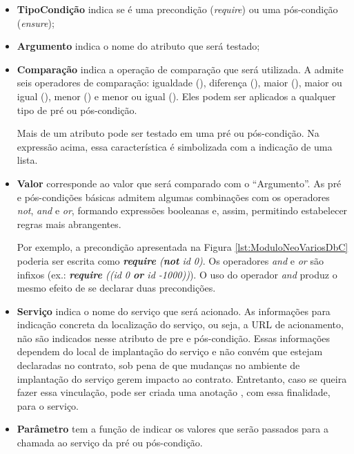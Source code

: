 \begin{itemize}
\item \textbf{TipoCondição} indica se é uma precondição (\emph{require}) ou uma
pós-condição (\emph{ensure});

\item \textbf{Argumento} indica o nome do atributo que será testado; 

\item \textbf{Comparação} indica a operação de comparação que será utilizada. A
\neoidl{}  admite seis operadores de comparação: igualdade (\literal{==}), 
diferença (\literal{<>}), maior (\literal{>}), maior ou igual
(\literal{>=}), menor (\literal{<}) e menor ou igual (\literal{<=}). Eles podem ser aplicados  a
qualquer tipo de pré ou pós-condição.

Mais de um atributo pode ser testado em uma pré ou pós-condição. Na expressão
acima, essa característica é simbolizada com a indicação de uma lista.

\item \textbf{Valor} corresponde ao valor que será comparado com o
``Argumento''.
As pré e pós-condições básicas admitem algumas combinações com os operadores
\emph{not}, \emph{and} e \emph{or}, formando expressões booleanas e,
assim, permitindo estabelecer regras mais abrangentes.

Por exemplo, a precondição apresentada na Figura \ref{lst:ModuloNeoVariosDbC} poderia
ser escrita como \emph{\textbf{require} (\textbf{not} id \literal{<=} 0)}. Os
operadores \emph{and} e \emph{or} são infixos (ex.: \emph{\textbf{require}
((id \literal{>} 0 \textbf{or} id \literal{<=} -1000))}). O uso do operador
\emph{and} produz o mesmo efeito de se declarar duas precondições.

\item \textbf{Serviço} indica o nome do serviço que será acionado. As
informações para indicação concreta da localização do serviço, ou seja, a URL de acionamento, não
são indicados nesse atributo de pre e pós-condição. Essas informações dependem
do local de implantação do serviço e não convém que estejam declaradas no
contrato, sob pena de que mudanças no ambiente de implantação do serviço gerem
impacto ao contrato.
Entretanto, caso se queira fazer essa vinculação, pode ser criada uma anotação
\neoidl{}, com essa finalidade, para o serviço.

\item \textbf{Parâmetro} tem a função de indicar os valores que serão passados
para a chamada ao serviço da pré ou pós-condição.


\end{itemize}
